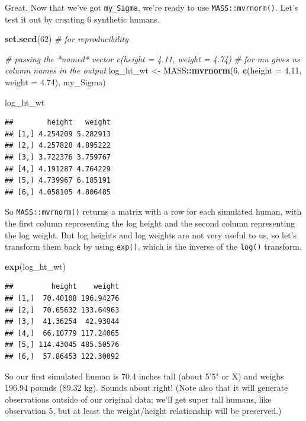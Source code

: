 \documentclass[]{book}
\newenvironment{Shaded}{\begin{snugshade}}{\end{snugshade}}
\newcommand{\CommentTok}[1]{\textcolor[rgb]{0.56,0.35,0.01}{\textit{#1}}}
\newcommand{\DataTypeTok}[1]{\textcolor[rgb]{0.13,0.29,0.53}{#1}}
\newcommand{\DecValTok}[1]{\textcolor[rgb]{0.00,0.00,0.81}{#1}}
\newcommand{\FloatTok}[1]{\textcolor[rgb]{0.00,0.00,0.81}{#1}}
\newcommand{\KeywordTok}[1]{\textcolor[rgb]{0.13,0.29,0.53}{\textbf{#1}}}
\newcommand{\NormalTok}[1]{#1}
\newcommand{\OperatorTok}[1]{\textcolor[rgb]{0.81,0.36,0.00}{\textbf{#1}}}
\newcommand{\StringTok}[1]{\textcolor[rgb]{0.31,0.60,0.02}{#1}}
\begin{document}
Great. Now that we've got \texttt{my\_Sigma}, we're ready to use \texttt{MASS::mvrnorm()}. Let's test it out by creating 6 synthetic humans.

\begin{Shaded}
\begin{Highlighting}[]
\KeywordTok{set.seed}\NormalTok{(}\DecValTok{62}\NormalTok{) }\CommentTok{# for reproducibility}

\CommentTok{# passing the *named* vector c(height = 4.11, weight = 4.74)}
\CommentTok{# for mu gives us column names in the output}
\NormalTok{log_ht_wt <-}\StringTok{ }\NormalTok{MASS}\OperatorTok{::}\KeywordTok{mvrnorm}\NormalTok{(}\DecValTok{6}\NormalTok{, }
                           \KeywordTok{c}\NormalTok{(}\DataTypeTok{height =} \FloatTok{4.11}\NormalTok{, }\DataTypeTok{weight =} \FloatTok{4.74}\NormalTok{), }
\NormalTok{                           my_Sigma)}

\NormalTok{log_ht_wt}
\end{Highlighting}
\end{Shaded}

\begin{verbatim}
##        height   weight
## [1,] 4.254209 5.282913
## [2,] 4.257828 4.895222
## [3,] 3.722376 3.759767
## [4,] 4.191287 4.764229
## [5,] 4.739967 6.185191
## [6,] 4.058105 4.806485
\end{verbatim}

So \texttt{MASS::mvrnorm()} returns a matrix with a row for each simulated human, with the first column representing the log height and the second column representing the log weight. But log heights and log weights are not very useful to us, so let's transform them back by using \texttt{exp()}, which is the inverse of the \texttt{log()} transform.

\begin{Shaded}
\begin{Highlighting}[]
\KeywordTok{exp}\NormalTok{(log_ht_wt)}
\end{Highlighting}
\end{Shaded}

\begin{verbatim}
##         height    weight
## [1,]  70.40108 196.94276
## [2,]  70.65632 133.64963
## [3,]  41.36254  42.93844
## [4,]  66.10779 117.24065
## [5,] 114.43045 485.50576
## [6,]  57.86453 122.30092
\end{verbatim}

So our first simulated human is 70.4 inches tall (about 5'5" or X) and weighs 196.94 pounds (89.32 kg). Sounds about right! (Note also that it will generate observations outside of our original data; we'll get super tall humans, like observation 5, but at least the weight/height relationship will be preserved.)
\end{document}
